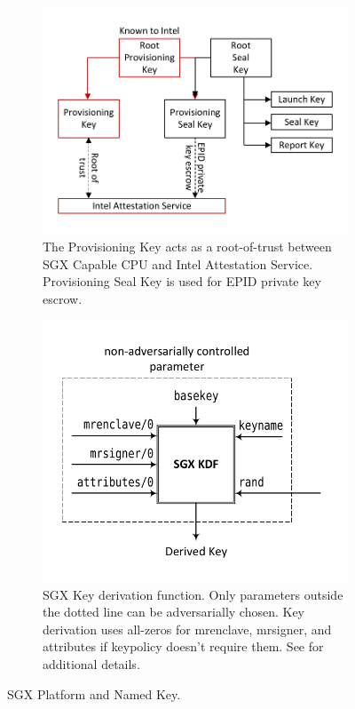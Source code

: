 \documentclass[10pt]{article}
\newcommand{\mrenclave}{\textsf{mrenclave}}
\newcommand{\mrsigner}{\textsf{mrsigner}}
\begin{document}
  \begin{figure}
  \centering
  \begin{subfigure}[t]{.45\textwidth}
    \centering
    \includegraphics[width=\linewidth]{Diagrams/KeyHierarchy}
    \caption{The Provisioning Key acts as a root-of-trust between SGX
      Capable CPU and Intel Attestation Service.  Provisioning Seal
      Key is used for EPID private key escrow.}
    \label{fig:keyhierarchy}
  \end{subfigure}
  \hspace{.05\textwidth}
  \begin{subfigure}[t]{.45\textwidth}
    \centering
    \includegraphics[width=\linewidth]{Diagrams/SGXKDF}
    \caption{SGX Key derivation function. Only parameters outside the
      dotted line can be adversarially chosen. Key derivation uses
      all-zeros for \mrenclave, \mrsigner, and attributes if keypolicy
      doesn't require them. See \cite[\S38.17]{intelsdm} for
      additional details.}
    \label{fig:sgxkdf}
  \end{subfigure}
  \caption{SGX Platform and Named Key.}
  \label{fig:keys}
  \end{figure}
\end{document}

